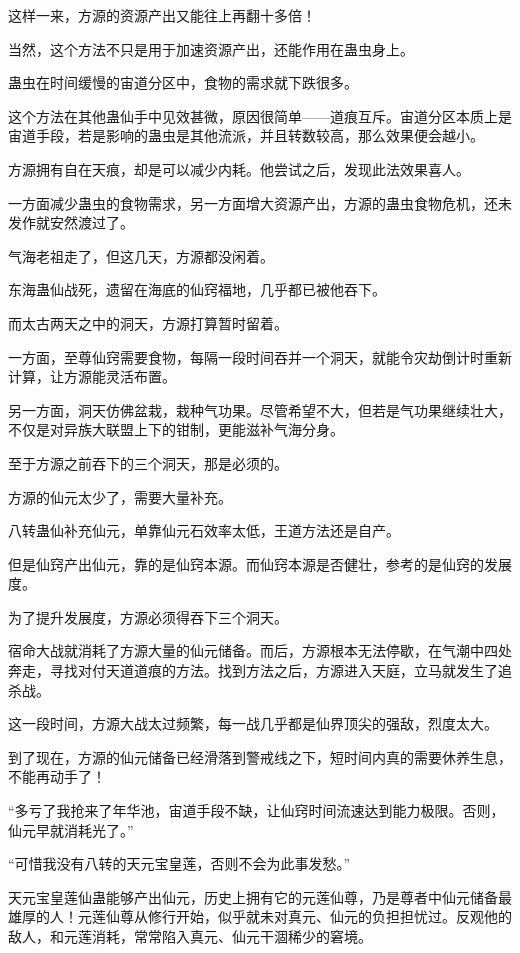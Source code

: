 \begin{this_body}
这样一来，方源的资源产出又能往上再翻十多倍！

当然，这个方法不只是用于加速资源产出，还能作用在蛊虫身上。

蛊虫在时间缓慢的宙道分区中，食物的需求就下跌很多。

这个方法在其他蛊仙手中见效甚微，原因很简单——道痕互斥。宙道分区本质上是宙道手段，若是影响的蛊虫是其他流派，并且转数较高，那么效果便会越小。

方源拥有自在天痕，却是可以减少内耗。他尝试之后，发现此法效果喜人。

一方面减少蛊虫的食物需求，另一方面增大资源产出，方源的蛊虫食物危机，还未发作就安然渡过了。

气海老祖走了，但这几天，方源都没闲着。

东海蛊仙战死，遗留在海底的仙窍福地，几乎都已被他吞下。

而太古两天之中的洞天，方源打算暂时留着。

一方面，至尊仙窍需要食物，每隔一段时间吞并一个洞天，就能令灾劫倒计时重新计算，让方源能灵活布置。

另一方面，洞天仿佛盆栽，栽种气功果。尽管希望不大，但若是气功果继续壮大，不仅是对异族大联盟上下的钳制，更能滋补气海分身。

至于方源之前吞下的三个洞天，那是必须的。

方源的仙元太少了，需要大量补充。

八转蛊仙补充仙元，单靠仙元石效率太低，王道方法还是自产。

但是仙窍产出仙元，靠的是仙窍本源。而仙窍本源是否健壮，参考的是仙窍的发展度。

为了提升发展度，方源必须得吞下三个洞天。

宿命大战就消耗了方源大量的仙元储备。而后，方源根本无法停歇，在气潮中四处奔走，寻找对付天道道痕的方法。找到方法之后，方源进入天庭，立马就发生了追杀战。

这一段时间，方源大战太过频繁，每一战几乎都是仙界顶尖的强敌，烈度太大。

到了现在，方源的仙元储备已经滑落到警戒线之下，短时间内真的需要休养生息，不能再动手了！

“多亏了我抢来了年华池，宙道手段不缺，让仙窍时间流速达到能力极限。否则，仙元早就消耗光了。”

“可惜我没有八转的天元宝皇莲，否则不会为此事发愁。”

天元宝皇莲仙蛊能够产出仙元，历史上拥有它的元莲仙尊，乃是尊者中仙元储备最雄厚的人！元莲仙尊从修行开始，似乎就未对真元、仙元的负担担忧过。反观他的敌人，和元莲消耗，常常陷入真元、仙元干涸稀少的窘境。


\end{this_body}
